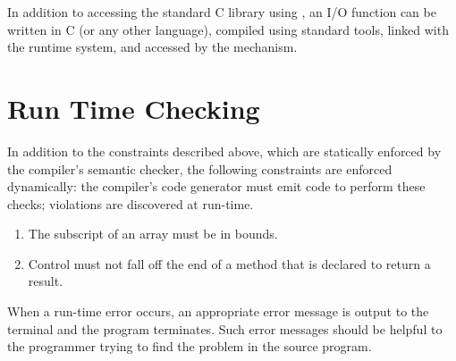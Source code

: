 In addition to accessing the standard C library using , an
I/O function can be written in C (or any other language), compiled using
standard tools, linked with the runtime system, and accessed by the
 mechanism.



\section*{Run Time Checking}

In addition to the constraints described above, which are statically
enforced by the compiler's semantic checker, the following constraints
are enforced dynamically: the compiler's code generator must emit
code to perform these checks; violations are discovered at run-time.

\begin{enumerate}
\item The subscript of an array must be in bounds.
\item Control must not fall off the end of a method that is declared to
      return a result.
\end{enumerate}

When a run-time error occurs, an appropriate error message is output to
the terminal and the program terminates.  Such error messages should be
helpful to the programmer trying to find the problem in the source
program.


